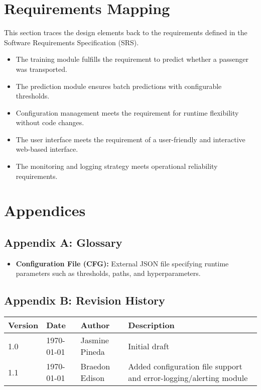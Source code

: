 \documentclass[15pt]{article}
\begin{document}
\section{Requirements Mapping}
This section traces the design elements back to the requirements defined in the Software Requirements Specification (SRS).

\begin{itemize}
    \item The training module fulfills the requirement to predict whether a passenger was transported.
    \item The prediction module ensures batch predictions with configurable thresholds.
    \item Configuration management meets the requirement for runtime flexibility without code changes.
    \item The user interface meets the requirement of a user-friendly and interactive web-based interface.
    \item The monitoring and logging strategy meets operational reliability requirements.
\end{itemize}

\section{Appendices}

\subsection{Appendix A: Glossary}

\begin{itemize}
    \item \textbf{Configuration File (CFG):} External JSON file specifying runtime parameters such as thresholds, paths, and hyperparameters.
\end{itemize}

\subsection{Appendix B: Revision History}
\begin{tabular}{|l|l|l|l|}
\hline
Version & Date & Author & Description \\
\hline
1.0 & \today & Jasmine Pineda & Initial draft \\
\hline
1.1 & \today & Braedon Edison & Added configuration file support and error-logging/alerting module \\
\hline
\end{tabular}
\end{document}

